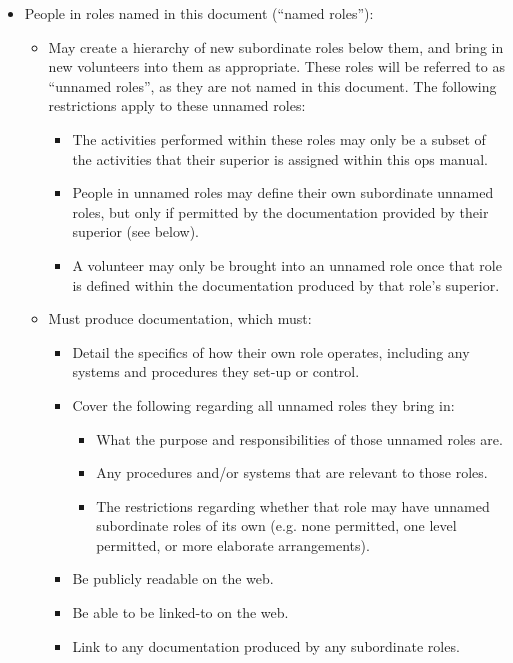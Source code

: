 \begin{itemize}
\item People in roles named in this document (``named roles''):
  \begin{itemize}
  \item May create a hierarchy of new subordinate roles below them, and bring in new volunteers into them as appropriate.  These roles will be referred to as ``unnamed roles'', as they are not named in this document.  The following restrictions apply to these unnamed roles:
    \begin{itemize}
    \item The activities performed within these roles may only be a subset of the activities that their superior is assigned within this ops manual.
    \item People in unnamed roles may define their own subordinate unnamed roles, but only if permitted by the documentation provided by their superior (see below).
    \item A volunteer may only be brought into an unnamed role once that role is defined within the documentation produced by that role's superior.
    \end{itemize}

  \item Must produce documentation, which must:
    \begin{itemize}
    \item Detail the specifics of how their own role operates, including any systems and procedures they set-up or control.

    \item Cover the following regarding all unnamed roles they bring in:
      \begin{itemize}
      \item What the purpose and responsibilities of those unnamed roles are.
      \item Any procedures and/or systems that are relevant to those roles.

      \item The restrictions regarding whether that role may have unnamed subordinate roles of its own (e.g. none permitted, one level permitted, or more elaborate arrangements).
      \end{itemize}


  \item Be publicly readable on the web.

  \item Be able to be linked-to on the web.

  \item Link to any documentation produced by any subordinate roles.


\end{itemize}
\end{itemize}
\end{itemize}
